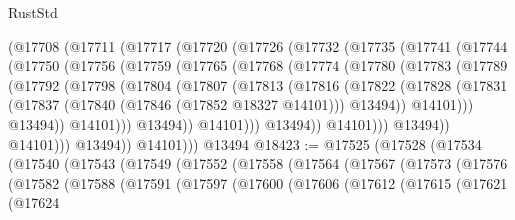 \begin{lexlean}{RustStd}
\begin{coremodule}
        (@17708
          (@17711
            (@17717
              (@17720
                (@17726
                  (@17732
                    (@17735
                      (@17741
                        (@17744
                          (@17750
                            (@17756
                              (@17759
                                (@17765
                                  (@17768
                                    (@17774
                                      (@17780
                                        (@17783
                                          (@17789
                                            (@17792
                                              (@17798
                                                (@17804
                                                  (@17807
                                                    (@17813
                                                      (@17816
                                                        (@17822
                                                          (@17828
                                                            (@17831
                                                              (@17837
                                                                (@17840
                                                                  (@17846 (@17852 @18327 @14101)))
                                                                @13494))
                                                            @14101)))
                                                      @13494))
                                                  @14101)))
                                            @13494))
                                        @14101)))
                                  @13494))
                              @14101)))
                        @13494))
                    @14101)))
              @13494))
          @14101)))
    @13494
@18423 := @17525
    (@17528
      (@17534
        (@17540
          (@17543
            (@17549
              (@17552
                (@17558
                  (@17564
                    (@17567
                      (@17573
                        (@17576
                          (@17582
                            (@17588
                              (@17591
                                (@17597
                                  (@17600
                                    (@17606
                                      (@17612
                                        (@17615
                                          (@17621
                                            (@17624

\end{coremodule}
\end{lexlean}
